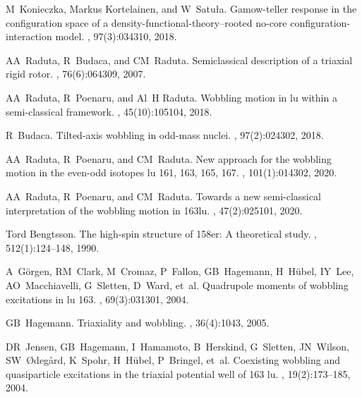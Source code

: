 \documentclass[11pt]{article}
\begin{document}
\begin{thebibliography}{99}
M~Konieczka, Markus Kortelainen, and W~Satu{\l}a.
\newblock Gamow-teller response in the configuration space of a
  density-functional-theory--rooted no-core configuration-interaction model.
, 97(3):034310, 2018.

AA~Raduta, R~Budaca, and CM~Raduta.
\newblock Semiclassical description of a triaxial rigid rotor.
, 76(6):064309, 2007.

AA~Raduta, R~Poenaru, and Al~H Raduta.
\newblock Wobbling motion in lu within a semi-classical framework.
,
  45(10):105104, 2018.

R~Budaca.
\newblock Tilted-axis wobbling in odd-mass nuclei.
, 97(2):024302, 2018.

AA~Raduta, R~Poenaru, and CM~Raduta.
\newblock New approach for the wobbling motion in the even-odd isotopes lu 161,
  163, 165, 167.
, 101(1):014302, 2020.

AA~Raduta, R~Poenaru, and CM~Raduta.
\newblock Towards a new semi-classical interpretation of the wobbling motion in
  163lu.
,
  47(2):025101, 2020.

Tord Bengtsson.
\newblock The high-spin structure of 158er: A theoretical study.
, 512(1):124--148, 1990.

A~G{\"o}rgen, RM~Clark, M~Cromaz, P~Fallon, GB~Hagemann, H~H{\"u}bel, IY~Lee,
  AO~Macchiavelli, G~Sletten, D~Ward, et~al.
\newblock Quadrupole moments of wobbling excitations in lu 163.
, 69(3):031301, 2004.

GB~Hagemann.
\newblock Triaxiality and wobbling.
, 36(4):1043, 2005.

DR~Jensen, GB~Hagemann, I~Hamamoto, B~Herskind, G~Sletten, JN~Wilson,
  SW~{\O}deg{\aa}rd, K~Spohr, H~H{\"u}bel, P~Bringel, et~al.
\newblock Coexisting wobbling and quasiparticle excitations in the triaxial
  potential well of 163 lu.
,
  19(2):173--185, 2004.


\end{thebibliography}
\end{document}

